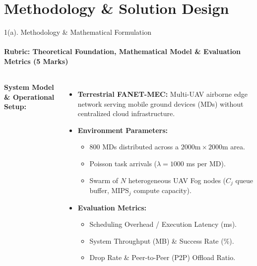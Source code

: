 \documentclass[aspectratio=169, 11pt]{beamer}
\begin{document}
\section{Methodology \& Solution Design}
\begin{frame}{1(a). Methodology \& Mathematical Formulation}
    \framesubtitle{Rubric: Theoretical Foundation, Mathematical Model \& Evaluation Metrics (5 Marks)}
    \begin{columns}[T]
        \textbf{System Model \& Operational Setup:}
        \begin{itemize}\setlength{\itemsep}{2pt}\footnotesize
            \item \textbf{Terrestrial FANET-MEC:} Multi-UAV airborne edge network serving mobile ground devices (MDs) without centralized cloud infrastructure.
            \item \textbf{Environment Parameters:} 
            \begin{itemize}\scriptsize
                \item 800 MDs distributed across a $2000\text{m} \times 2000\text{m}$ area.
                \item Poisson task arrivals ($\lambda = 1000$ ms per MD).
                \item Swarm of $N$ heterogeneous UAV Fog nodes ($C_j$ queue buffer, $\text{MIPS}_j$ compute capacity).
            \end{itemize}
            \item \textbf{Evaluation Metrics:}
            \begin{itemize}\scriptsize
                \item Scheduling Overhead / Execution Latency (ms).
                \item System Throughput (MB) \& Success Rate (\%).
                \item Drop Rate \& Peer-to-Peer (P2P) Offload Ratio.
            \end{itemize}
        \end{itemize}


\end{columns}
\end{frame}
\end{document}
